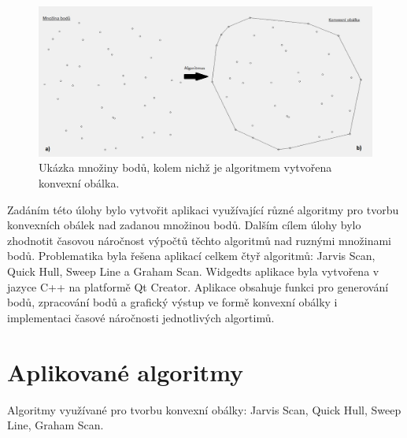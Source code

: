 \documentclass[a4paper, 12pt]{article}
\begin{document}
\begin{figure}[h!]
	\centering
	\includegraphics[width=16cm]{convex_hull.jpg}
	\caption{Ukázka množiny bodů, kolem nichž je algoritmem vytvořena konvexní obálka.}
\end{figure}

Zadáním této úlohy bylo vytvořit aplikaci využívající různé algoritmy pro tvorbu konvexních obálek nad zadanou množinou bodů. Dalším cílem úlohy bylo zhodnotit časovou náročnost výpočtů těchto algoritmů nad ruznými množinami bodů. Problematika byla řešena aplikací celkem čtyř algoritmů: Jarvis Scan, Quick Hull, Sweep Line a Graham Scan. Widgedts aplikace byla vytvořena v jazyce C++ na platformě Qt Creator. Aplikace obsahuje funkci pro generování bodů, zpracování bodů a grafický výstup ve formě konvexní obálky i implementaci časové náročnosti jednotlivých algortimů. \\

\section{Aplikované algoritmy}
Algoritmy využívané pro tvorbu konvexní obálky: Jarvis Scan, Quick Hull, Sweep Line, Graham Scan. 
\end{document}

